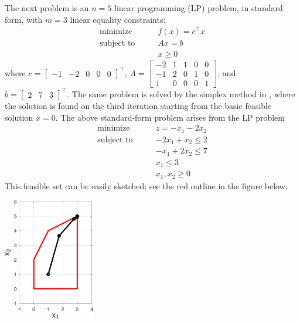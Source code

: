 \documentclass[11pt]{article}
\newcommand{\ds}{\displaystyle}
\begin{document}
The next problem is an $n=5$ linear programming (LP) problem, in standard form, with $m=3$ linear equality constraints:
\begin{equation}
\begin{matrix}
\text{minimize} \qquad & f(x) = c^\top x \\
\text{subject to} \qquad & A x = b \\
 & x \ge 0
\end{matrix} \label{eq:linearproblem}
\end{equation}
where $\ds c = \begin{bmatrix} -1 & -2 & 0 & 0 & 0 \end{bmatrix}^\top$, $\ds A = \begin{bmatrix} -2 & 1 & 1 & 0 & 0 \\ -1 & 2 & 0 & 1 & 0 \\ 1 & 0 & 0 & 0 & 1 \end{bmatrix}$, and $\ds b = \begin{bmatrix} 2 & 7 & 3 \end{bmatrix}^\top$.  The same problem is solved by the simplex method in \cite[section 5.2]{GrivaNashSofer2009}, where the solution is found on the third iteration starting from the basic feasible solution $x=0$.  The above standard-form problem arises from the LP problem
\begin{equation}
\begin{matrix}
\text{minimize} \qquad & z = -x_1 - 2x_2 \\
\text{subject to} \qquad & -2x_1 + x_2 \le 2 \\
 & -x_1 + 2x_2 \le 7 \\
 & x_1 \le 3 \\
 & x_1, x_2 \ge 0
\end{matrix} \label{eq:twodlp}
\end{equation}
This feasible set can be easily sketched; see the red outline in the figure below.

\bigskip
\begin{center}
\includegraphics[width=0.3\textwidth]{figs/linear.pdf}
\end{center}
\end{document}
